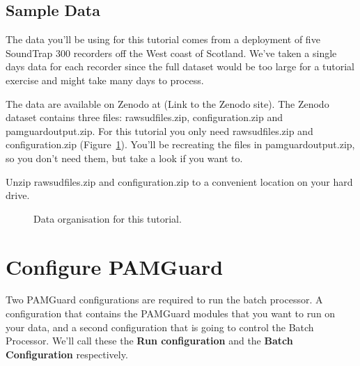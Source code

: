 \documentclass[
]{article}
\begin{document}
\subsection{Sample Data}\label{sample-data}

The data you'll be using for this tutorial comes from a deployment of
five SoundTrap 300 recorders off the West coast of Scotland. We've taken
a single days data for each recorder since the full dataset would be too
large for a tutorial exercise and might take many days to process.

The data are available on Zenodo at (Link to the Zenodo site). The
Zenodo dataset contains three files: rawsudfiles.zip, configuration.zip
and pamguardoutput.zip. For this tutorial you only need rawsudfiles.zip
and configuration.zip (Figure~\ref{fig-data}). You'll be recreating the
files in pamguardoutput.zip, so you don't need them, but take a look if
you want to.

Unzip rawsudfiles.zip and configuration.zip to a convenient location on
your hard drive.

\begin{figure}


\caption{\label{fig-data}Data organisation for this tutorial.}

\end{figure}%

\section{Configure PAMGuard}\label{configure-pamguard}

Two PAMGuard configurations are required to run the batch processor. A
configuration that contains the PAMGuard modules that you want to run on
your data, and a second configuration that is going to control the Batch
Processor. We'll call these the \textbf{Run configuration} and the
\textbf{Batch Configuration} respectively.
\end{document}
